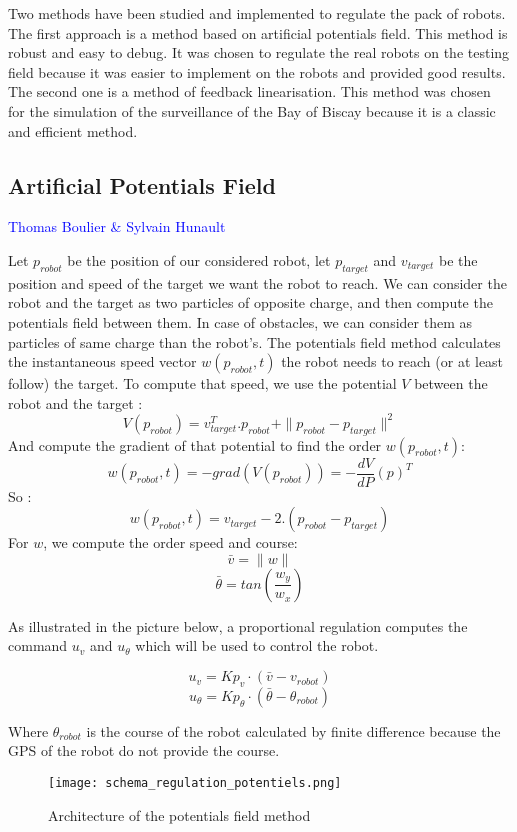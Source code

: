 Two methods have been studied and implemented to regulate the pack of robots. The first approach is a method based on artificial potentials field. This method is robust and easy to debug. It was chosen to regulate the real robots on the testing field because it was easier to implement on the robots and provided good results. The second one is a method of feedback linearisation. This method was chosen for the simulation of the surveillance of the Bay of Biscay because it is a classic and efficient method.

\subsection{Artificial Potentials Field}
\vspace*{0.5 cm}
\textcolor{blue} {Thomas Boulier \& Sylvain Hunault}
\vspace*{0.5cm}

Let $p_{robot}$ be the position of our considered robot, let $p_{target}$ and $v_{target}$ be the position and speed of the target we want the robot to reach.
We can consider the robot and the target as two particles of opposite charge, and then compute the potentials field between them. In case of obstacles, we can consider them as particles of same charge than the robot's.
The potentials field method calculates the instantaneous speed vector $w(p_{robot},t)$ the robot needs to reach (or at least follow) the target. To compute that speed, we use the potential $V$ between the robot and the target :\\
\[ V(p_{robot}) = v^T_{target}. p_{robot} + \|p_{robot}-p_{target}\|^2 \]
And compute the gradient of that potential to find the order $w(p_{robot},t)$:
\[w(p_{robot},t) = -grad(V(p_{robot})) = -\frac{dV}{dP}(p)^T\]
So :
\[w(p_{robot},t) = v_{target}-2.(p_{robot}-p_{target})\]
For $w$, we compute the order speed and course:
\[\bar{v} = \|w\| \]
\[\bar{\theta} = tan(\frac{w_y}{w_x})\]

As illustrated in the picture below, a proportional regulation computes the command $u_v$ and $u_{\theta}$ which will be used to control the robot.

\[ u_v = Kp_v \cdot (\bar{v}-v_{robot}) \]
\[ u_{\theta} = Kp_{\theta} \cdot (\bar{\theta}-\theta_{robot}) \]

Where $\theta_{robot}$ is the course of the robot calculated by finite difference because the GPS of the robot do not provide the course.

\begin{figure}[H]
\centering
   \texttt{[image: schema\_regulation\_potentiels.png]}
   \caption{\label{schema_regulation_potentiels} Architecture of the potentials field method}
\end{figure}

